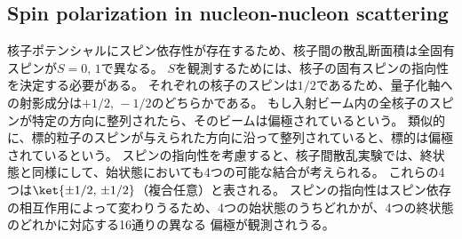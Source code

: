 \documentclass[a4paper,11pt,uplatex]{jsarticle}
\begin{document}
\subsection*{Spin polarization in nucleon-nucleon scattering}

核子ポテンシャルにスピン依存性が存在するため、核子間の散乱断面積は全固有スピンが$S=0,\,1$で異なる。
$S$を観測するためには、核子の固有スピンの指向性を決定する必要がある。
それぞれの核子のスピンは$1/2$であるため、量子化軸への射影成分は$+1/2,\,-1/2$のどちらかである。
もし入射ビーム内の全核子のスピンが特定の方向に整列されたら、そのビームは偏極されているという。
類似的に、標的粒子のスピンが与えられた方向に沿って整列されていると、標的は偏極されているという。
スピンの指向性を考慮すると、核子間散乱実験では、終状態と同様にして、始状態においても4つの可能な結合が考えられる。
これらの4つは$\ket{\pm1/2,\,\pm1/2}$（複合任意）と表される。
スピンの指向性はスピン依存の相互作用によって変わりうるため、4つの始状態のうちどれかが、4つの終状態のどれかに対応する16通りの異なる
偏極が観測されうる。
\end{document}
